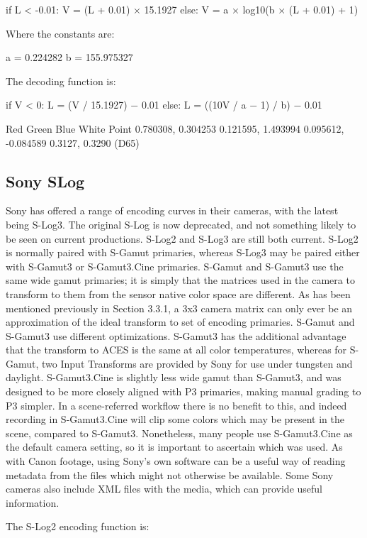 	if L < -0.01:
		V = (L + 0.01) × 15.1927
	else:
		V = a × log10(b × (L + 0.01) + 1)

Where the constants are:

	a = 0.224282
b = 155.975327



The decoding function is:

	if V < 0:
		L = (V / 15.1927) − 0.01
	else:
		L = ((10V / a − 1) / b) − 0.01


Red
Green
Blue
White Point
0.780308, 0.304253
0.121595, 1.493994
0.095612, -0.084589
0.3127, 0.3290 (D65)

\subsection{Sony SLog}%
\label{subsec:sony-slog}

Sony has offered a range of encoding curves in their cameras, with the latest being S-Log3. The original S-Log is now deprecated, and not something likely to be seen on current productions. S-Log2 and S-Log3 are still both current. S-Log2 is normally paired with S-Gamut primaries, whereas S-Log3 may be paired either with S-Gamut3 or S-Gamut3.Cine primaries. S-Gamut and S-Gamut3 use the same wide gamut primaries; it is simply that the matrices used in the camera to transform to them from the sensor native color space are different. As has been mentioned previously in Section 3.3.1, a 3x3 camera matrix can only ever be an approximation of the ideal transform to set of encoding primaries. S-Gamut and S-Gamut3 use different optimizations. S-Gamut3 has the additional advantage that the transform to ACES is the same at all color temperatures, whereas for S-Gamut, two Input Transforms are provided by Sony for use under tungsten and daylight. S-Gamut3.Cine is slightly less wide gamut than S-Gamut3, and was designed to be more closely aligned with P3 primaries, making manual grading to P3 simpler. In a scene-referred workflow there is no benefit to this, and indeed recording in S-Gamut3.Cine will clip some colors which may be present in the scene, compared to S-Gamut3. Nonetheless, many people use S-Gamut3.Cine as the default camera setting, so it is important to ascertain which was used. As with Canon footage, using Sony’s own software can be a useful way of reading metadata from the files which might not otherwise be available. Some Sony cameras also include XML files with the media, which can provide useful information.

The S-Log2 encoding function is:

